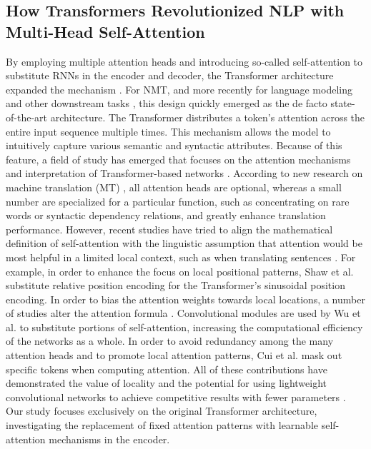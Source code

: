 \subsection{How Transformers Revolutionized NLP with Multi-Head Self-Attention} 
By employing multiple attention heads and introducing so-called self-attention to substitute RNNs in the encoder and decoder, the Transformer architecture expanded the mechanism \cite{Vaswani2017}. For NMT, and more recently for language modeling \cite{Radford2018} and other downstream tasks \cite{Strubell2018}, this design quickly emerged as the de facto state-of-the-art architecture. The Transformer distributes a token's attention across the entire input sequence multiple times. This mechanism allows the model to intuitively capture various semantic and syntactic attributes. Because of this feature, a field of study has emerged that focuses on the attention mechanisms and interpretation of Transformer-based networks \cite{Raganato2018}. According to new research on machine translation (MT) \cite{Voita2019b}, all attention heads are optional, whereas a small number are specialized for a particular function, such as concentrating on rare words or syntactic dependency relations, and greatly enhance translation performance. However, recent studies have tried to align the mathematical definition of self-attention with the linguistic assumption that attention would be most helpful in a limited local context, such as when translating sentences \cite{Hao2019a}. For example, in order to enhance the focus on local positional patterns, Shaw et al. \cite{Shaw2018} substitute relative position encoding for the Transformer's sinusoidal position encoding. In order to bias the attention weights towards local locations, a number of studies alter the attention formula \cite{Yang2018}. Convolutional modules are used by Wu et al. \cite{Wu2019} to substitute portions of self-attention, increasing the computational efficiency of the networks as a whole. In order to avoid redundancy among the many attention heads and to promote local attention patterns, Cui et al. \cite{Cui2019} mask out specific tokens when computing attention. All of these contributions have demonstrated the value of locality and the potential for using lightweight convolutional networks to achieve competitive results with fewer parameters \cite{Wu2019}. Our study focuses exclusively on the original Transformer architecture, investigating the replacement of fixed attention patterns with learnable self-attention mechanisms in the encoder.

